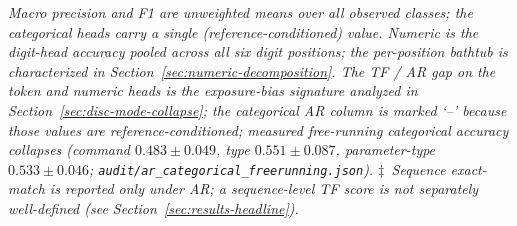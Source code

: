 \begin{table}[!htbp]
\footnotesize\textit{Macro precision and F1 are unweighted means over all observed classes; the categorical heads carry a single (reference-conditioned) value. Numeric is the digit-head accuracy pooled across all six digit positions; the per-position bathtub is characterized in Section~\ref{sec:numeric-decomposition}. The TF / AR gap on the token and numeric heads is the exposure-bias signature analyzed in Section~\ref{sec:disc-mode-collapse}; the categorical AR column is marked `--' because those values are reference-conditioned; measured free-running categorical accuracy collapses (command $0.483 \pm 0.049$, type $0.551 \pm 0.087$, parameter-type $0.533 \pm 0.046$; \texttt{audit/ar\_categorical\_freerunning.json}). $\ddagger$~Sequence exact-match is reported only under AR; a sequence-level TF score is not separately well-defined (see Section~\ref{sec:results-headline}).}
\end{table}
